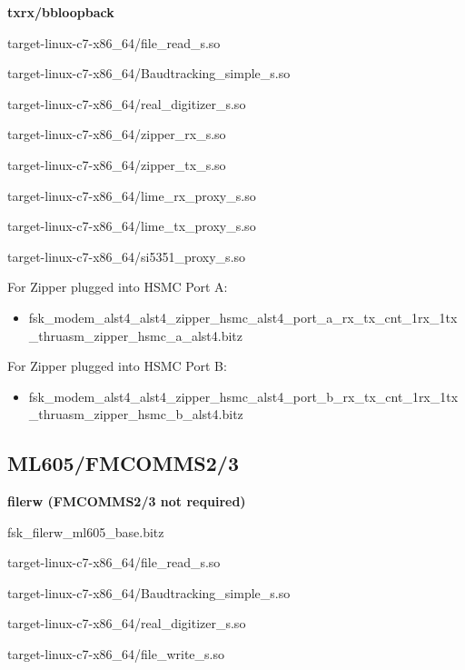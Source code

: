 	\noindent\textbf{txrx/bbloopback}
	\begin{itemize}
	\begin{minipage}[t]{.5\textwidth}
	\item target-linux-c7-x86\_64/file\_read\_s.so
	\item target-linux-c7-x86\_64/Baudtracking\_simple\_s.so
	\item target-linux-c7-x86\_64/real\_digitizer\_s.so
	\item target-linux-c7-x86\_64/zipper\_rx\_s.so
	\end{minipage}
	\begin{minipage}[t]{.5\textwidth}
	\item target-linux-c7-x86\_64/zipper\_tx\_s.so
	\item target-linux-c7-x86\_64/lime\_rx\_proxy\_s.so
	\item target-linux-c7-x86\_64/lime\_tx\_proxy\_s.so
	\item target-linux-c7-x86\_64/si5351\_proxy\_s.so
	\end{minipage}
	\end{itemize}
	For Zipper plugged into HSMC Port A:
	\begin{itemize}
		\item fsk\_modem\_alst4\_alst4\_zipper\_hsmc\_alst4\_port\_a\_rx\_tx\_cnt\_1rx\_1tx\_thruasm\_zipper\_hsmc\_a\_alst4.bitz 
	\end{itemize}
	\noindent For Zipper plugged into HSMC Port B:
	\begin{itemize}
		\item fsk\_modem\_alst4\_alst4\_zipper\_hsmc\_alst4\_port\_b\_rx\_tx\_cnt\_1rx\_1tx\_thruasm\_zipper\_hsmc\_b\_alst4.bitz
	\end{itemize}





\pagebreak
\subsection{ML605/FMCOMMS2/3}
	\noindent\textbf{filerw (FMCOMMS2/3 not required)}
	\begin{itemize}
	\begin{minipage}[t]{.5\textwidth}
	\item fsk\_filerw\_ml605\_base.bitz
	\item target-linux-c7-x86\_64/file\_read\_s.so
	\item target-linux-c7-x86\_64/Baudtracking\_simple\_s.so
	\end{minipage}
	\begin{minipage}[t]{.5\textwidth}
	\item target-linux-c7-x86\_64/real\_digitizer\_s.so
	\item target-linux-c7-x86\_64/file\_write\_s.so
	\end{minipage}
	\end{itemize}
	
